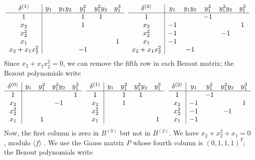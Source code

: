 \documentclass{standalone}
\begin{document}
$$
\begin{array}{c|ccccc}
	\delta^{(1)}  & y_1 & y_1y_2 & y_1^2 & y_1^2y_2 & y_1^3 \\
	\hline
	1  &  &  & 1 & 1 & \\
	x_2  &  &  & 1 &  & \\
	x_2^2  &  &  &  &  & \\
	x_1  &  &  &  &  & 1 \\
	x_2 + x_1x_2^2  &  &  & -1 &  &
\end{array}
\hspace{0.2cm}
\begin{array}{c|ccccc}
	\delta^{(2)} & y_1 & y_1y_2 & y_1^2 & y_1^2y_2 & y_1^3 \\
	\hline
	1  &  &  & -1 &  & \\
	x_2  & -1 &  &  &  & 1 \\
	x_2^2  & -1 &  &  & -1 & \\
	x_1  & -1 &  &  &  & \\
	x_2 + x_1x_2^2 &  & -1 &  &  &
\end{array}
$$
Since $x_2 + x_1x_2^{2} = 0$, we can remove the fifth row in each Bezout matrix; the Bezout polynomials write
$$
\begin{array}{c|cccc}
	\delta^{(0)} & y_1 & y_1^2 & y_1^2y_2 & y_1^3 \\
	\hline
	1  &   &  &  & 1 \\
	x_2  &  &  & -1 & \\
	x_2^2  &  &  &  & \\
	x_1  &  & 1 &  &
\end{array}
\hspace{0.2cm}
\begin{array}{c|cccc}
	\delta^{(1)}  & y_1 & y_1^2 & y_1^2y_2 & y_1^3 \\
	\hline
	1  &  & 1 & 1 & \\
	x_2  &  & 1 &  & \\
	x_2^2  &  &  &  & \\
	x_1  &  &  &  & 1
\end{array}
\hspace{0.2cm}
\begin{array}{c|cccc}
	\delta^{(2)} & y_1 & y_1^2 & y_1^2y_2 & y_1^3 \\
	\hline
	1  &  & -1 &  & \\
	x_2  & -1 &  &  & 1 \\
	x_2^2  & -1 &  & -1 & \\
	x_1  & -1 &  &  &
\end{array}
$$
Now, the first column is zero in $B^{(0)}$ but not in $B^{(2)}$. We have $x_2 + x_2^{2} + x_1 = 0$, modulo $\langle f \rangle$ . We use the Gauss matrix $P$ whose fourth column is $(0, 1, 1, 1)^{T}$; the Bezout polynomials write
\end{document}
